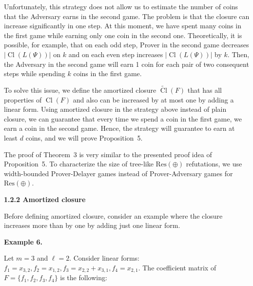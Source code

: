 \documentclass[10pt,a4paper]{article}
\begin{document}
Unfortunately, this strategy does not allow us to estimate the number of coins that the Adversary earns in the second game. The problem is that the closure can increase significantly in one step. At this moment, we have spent many coins in the first game while earning only one coin in the second one.
Theoretically, it is possible, for example, that on each odd step, Prover in the second game decreases $|\mathop{\mathrm{Cl}}(L(\Psi))|$ on $k$ and on each even step increases $|\mathop{\mathrm{Cl}}(L(\Psi))|$ by $k$. Then, the Adversary in the second game will earn 1 coin for each pair of two consequent steps while spending $k$ coins in the first game.\par



To solve this issue, we define the amortized closure $\widetilde{\mathop{\mathrm{Cl}}}(F)$ that has all properties of $\mathop{\mathrm{Cl}}(F)$ and also can be increased by at most one by adding a linear form. Using amortized closure in the strategy above instead of plain closure, we can guarantee that every time we spend a coin in the first game, we earn a coin in the second game. Hence, the strategy will guarantee to earn at least $d$ coins, and we will prove Proposition 5.\par



The proof of Theorem 3 is very similar to the presented proof idea of Proposition 5. To characterize the size of tree-like $\mathrm{Res}(\oplus)$ refutations, we use width-bounded Prover-Delayer games instead of Prover-Adversary games for $\mathrm{Res}(\oplus)$.\par


\par\medskip\noindent\textbf{
1.2.2 Amortized closure}\par


Before defining amortized closure, consider an example where the closure increases more than by one by adding just one linear form.\par



\par\medskip\noindent\textbf{
Example 6.
}\par



Let $m=3$ and $\ell=2$. Consider linear forms: $f_{1}=x_{3,2},f_{2}=x_{1,2},f_{3}=x_{2,2}+x_{3,1},f_{4}=x_{2,1}$.
The coefficient matrix of $F=\{f_{1},f_{2},f_{3},f_{4}\}$ is the following:\par
\end{document}

